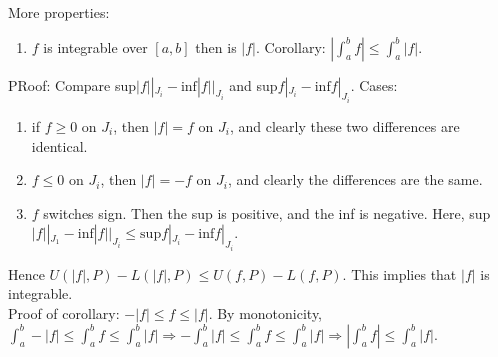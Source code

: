 \documentclass[10pt,letter]{article}
\begin{document}
More properties: \begin{enumerate}
    \item $f$ is integrable over $[a,b]$ then is $|f|$. Corollary: $|\int_a^bf|\leq \int_a^b|f|$. 
\end{enumerate}
PRoof: Compare sup$|f||_{J_i}-\text{inf}|f||_{J_i}$ and sup$f|_{J_i}-\text{inf}f|_{J_i}$. Cases: \begin{enumerate}
    \item if $f\geq0$ on $J_i$, then $|f|=f$ on $J_i$, and clearly these two differences are identical.   
    \item $f\leq0$ on $J_i$, then $|f|=-f$ on $J_i$, and clearly the differences are the same.
    \item $f$ switches sign. Then the sup is positive, and the inf is negative. Here, sup$|f||_{J_1}-\text{inf}|f||_{J_i}\leq \text{sup}f|_{J_i}-\text{inf}f|_{J_i}$.
\end{enumerate}
Hence $U(|f|,P)-L(|f|,P)\leq U(f,P)-L(f,P)$. This implies that $|f|$ is integrable.\\ 
Proof of corollary: $-|f|\leq f\leq |f|$. By monotonicity, $\int_a^b-|f|\leq \int_a^bf\leq \int_a^b|f|\Rightarrow-\int_a^b|f|\leq \int_a^bf\leq \int_a^b|f|\Rightarrow |\int_a^bf|\leq\int_a^b|f|$. 
\end{document}
